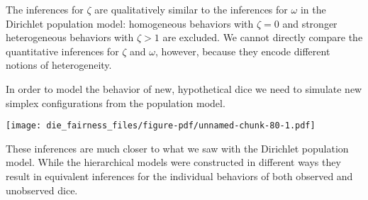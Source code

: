 \documentclass[
  letterpaper,
  DIV=11,
  numbers=noendperiod]{scrartcl}
\newenvironment{Shaded}{\begin{snugshade}}{\end{snugshade}}
\newcommand{\AttributeTok}[1]{\textcolor[rgb]{0.40,0.45,0.13}{#1}}
\newcommand{\ControlFlowTok}[1]{\textcolor[rgb]{0.00,0.23,0.31}{#1}}
\newcommand{\DecValTok}[1]{\textcolor[rgb]{0.68,0.00,0.00}{#1}}
\newcommand{\FloatTok}[1]{\textcolor[rgb]{0.68,0.00,0.00}{#1}}
\newcommand{\FunctionTok}[1]{\textcolor[rgb]{0.28,0.35,0.67}{#1}}
\newcommand{\NormalTok}[1]{\textcolor[rgb]{0.00,0.23,0.31}{#1}}
\newcommand{\OtherTok}[1]{\textcolor[rgb]{0.00,0.23,0.31}{#1}}
\newcommand{\SpecialCharTok}[1]{\textcolor[rgb]{0.37,0.37,0.37}{#1}}
\newcommand{\StringTok}[1]{\textcolor[rgb]{0.13,0.47,0.30}{#1}}
\begin{document}
The inferences for \(\zeta\) are qualitatively similar to the inferences
for \(\omega\) in the Dirichlet population model: homogeneous behaviors
with \(\zeta = 0\) and stronger heterogeneous behaviors with
\(\zeta > 1\) are excluded. We cannot directly compare the quantitative
inferences for \(\zeta\) and \(\omega\), however, because they encode
different notions of heterogeneity.

In order to model the behavior of new, hypothetical dice we need to
simulate new simplex configurations from the population model.

\begin{Shaded}
\end{Shaded}

\texttt{[image: die\_fairness\_files/figure-pdf/unnamed-chunk-80-1.pdf]}

These inferences are much closer to what we saw with the Dirichlet
population model. While the hierarchical models were constructed in
different ways they result in equivalent inferences for the individual
behaviors of both observed and unobserved dice.
\end{document}
